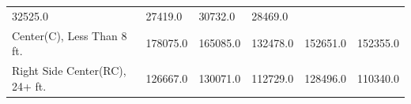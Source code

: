 \documentclass[]{article}
\begin{document}
\begin{longtable}[]{@{}llllll@{}}
\begin{minipage}[t]{0.12\columnwidth}
32525.0\strut
\end{minipage} & \begin{minipage}[t]{0.10\columnwidth}\raggedright\strut
27419.0\strut
\end{minipage} & \begin{minipage}[t]{0.12\columnwidth}\raggedright\strut
30732.0\strut
\end{minipage} & \begin{minipage}[t]{0.12\columnwidth}\raggedright\strut
28469.0\strut
\end{minipage}\tabularnewline
\begin{minipage}[t]{0.24\columnwidth}\raggedright\strut
Center(C), Less Than 8 ft.\strut
\end{minipage} & \begin{minipage}[t]{0.12\columnwidth}\raggedright\strut
178075.0\strut
\end{minipage} & \begin{minipage}[t]{0.12\columnwidth}\raggedright\strut
165085.0\strut
\end{minipage} & \begin{minipage}[t]{0.10\columnwidth}\raggedright\strut
132478.0\strut
\end{minipage} & \begin{minipage}[t]{0.12\columnwidth}\raggedright\strut
152651.0\strut
\end{minipage} & \begin{minipage}[t]{0.12\columnwidth}\raggedright\strut
152355.0\strut
\end{minipage}\tabularnewline
\begin{minipage}[t]{0.24\columnwidth}\raggedright\strut
Right Side Center(RC), 24+ ft.\strut
\end{minipage} & \begin{minipage}[t]{0.12\columnwidth}\raggedright\strut
126667.0\strut
\end{minipage} & \begin{minipage}[t]{0.12\columnwidth}\raggedright\strut
130071.0\strut
\end{minipage} & \begin{minipage}[t]{0.10\columnwidth}\raggedright\strut
112729.0\strut
\end{minipage} & \begin{minipage}[t]{0.12\columnwidth}\raggedright\strut
128496.0\strut
\end{minipage} & \begin{minipage}[t]{0.12\columnwidth}\raggedright\strut
110340.0\strut
\end{minipage}\tabularnewline

\end{longtable}
\end{document}
